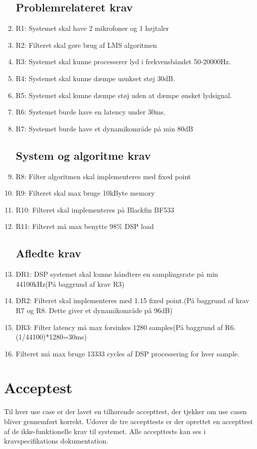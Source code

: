 \begin{enumerate}
	
	\subsection{Problemrelateret krav}
	\item R1: Systemet skal have 2 mikrofoner og 1 højtaler
	
	\item R2: Filteret skal gøre brug af LMS algoritmen
	
	\item R3: Systemet skal kunne processerer lyd i frekvensbåndet 50-20000Hz. 
	
	\item R4: Systemet skal kunne dæmpe uønkset støj 30dB.
	
	\item R5: Systemet skal kunne dæmpe støj uden at dæmpe ønsket lydsignal.
	
	\item R6: Systemet burde have en latency under 30ms.
	
	\item R7: Systemet burde have et dynamikområde på min 80dB
	
	\subsection{System og algoritme krav}
	
	\item R8: Filter algoritmen skal implementeres med fixed point 
	
	\item R9: Filteret skal max bruge 10kByte memory
	
	\item R10: Filteret skal implementeres på Blackfin BF533
	
	\item R11: Filteret må max benytte 98\% DSP load

	\subsection{Afledte krav}
	
	\item DR1: DSP systemet skal kunne håndtere en samplingsrate på min 44100kHz(På baggrund af krav R3) 
	
	\item DR2: Filteret skal implementeres med 1.15 fixed point.(På baggrund af krav R7 og R8. Dette giver et dynamikområde på 96dB)
	
	\item DR3: Filter latency må max forsinkes 1280 samples(På baggrund af R6. (1/44100)*1280=30ms)
	
	\item Filteret må max bruge 13333 cycles af DSP processering for hver sample. 
	
\end{enumerate}


\section{Acceptest}
Til hver use case er der lavet en tilhørende accepttest, der tjekker om use casen bliver gennemført korrekt. Udover de tre accepttests er der oprettet en accepttest af de ikke-funktionelle krav til systemet. Alle accepttests kan ses
i kravspecifikations dokumentation.